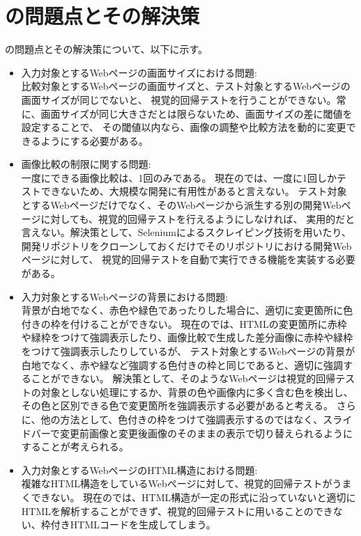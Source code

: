 \section{\toolName の問題点とその解決策}\label{sec:AWSEL_problems}
\toolName の問題点とその解決策について、以下に示す。
\begin{itemize}
    \item 入力対象とするWebページの画面サイズにおける問題:\\
          比較対象とするWebページの画面サイズと、テスト対象とするWebページの画面サイズが同じでないと、
          視覚的回帰テストを行うことができない。常に、画面サイズが同じ大きさだとは限らないため、画面サイズの差に閾値を設定することで、
          その閾値以内なら、画像の調整や比較方法を動的に変更できるようにする必要がある。
    \item 画像比較の制限に関する問題:\\
          一度にできる画像比較は、1回のみである。
          現在の\toolName では、一度に1回しかテストできないため、大規模な開発に有用性があると言えない。
          テスト対象とするWebページだけでなく、そのWebページから派生する別の開発Webページに対しても、視覚的回帰テストを行えるようにしなければ、
          実用的だと言えない。解決策として、Seleniumによるスクレイピング技術を用いたり、開発リポジトリをクローンしておくだけでそのリポジトリにおける開発Webページに対して、
          視覚的回帰テストを自動で実行できる機能を実装する必要がある。
    \item 入力対象とするWebページの背景における問題:\\
          背景が白地でなく、赤色や緑色であったりした場合に、適切に変更箇所に色付きの枠を付けることができない。
          現在の\toolName では、HTMLの変更箇所に赤枠や緑枠をつけて強調表示したり、画像比較で生成した差分画像に赤枠や緑枠をつけて強調表示したりしているが、
          テスト対象とするWebページの背景が白地でなく、赤や緑など強調する色付きの枠と同じであると、適切に強調することができない。
          解決策として、そのようなWebページは視覚的回帰テストの対象としない処理にするか、背景の色や画像内に多く含む色を検出し、その色と区別できる色で変更箇所を強調表示する必要があると考える。
          さらに、他の方法として、色付きの枠をつけて強調表示するのではなく、スライドバーで変更前画像と変更後画像のそのままの表示で切り替えられるようにすることが考えられる。
    \item 入力対象とするWebページのHTML構造における問題:\\
          複雑なHTML構造をしているWebページに対して、視覚的回帰テストがうまくできない。
          現在の\toolName では、HTML構造が一定の形式に沿っていないと適切にHTMLを解析することができず、視覚的回帰テストに用いることのできない、枠付きHTMLコードを生成してしまう。

\end{itemize}
